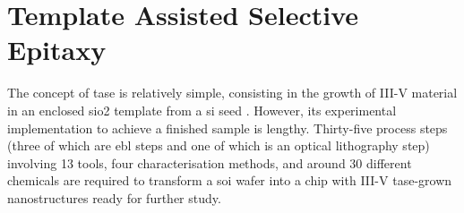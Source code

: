 \chapter{Template Assisted Selective Epitaxy}
\label{chap:tase}

The concept of \acf{tase} is relatively simple, consisting in the growth of III-V material in an enclosed \acf{sio2} template from a \acf{si} seed \cite{Schmid2015, borgTASEp2018}. However, its experimental implementation to achieve a finished sample is lengthy. Thirty-five process steps (three of which are \acf{ebl} steps and one of which is an optical lithography step) involving 13 tools, four characterisation methods, and around 30 different chemicals are required to transform a \acf{soi} wafer into a chip with III-V \acs{tase}-grown nanostructures ready for further study. 


